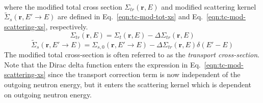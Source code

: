 \begin{appendices}
\begin{equation}
\begin{split}
\end{split}
\label{eqn:tc-transport-cont-energy}
\end{equation}
where the modified total cross section $\Sigma_{\textit{tr}}(\mathbf{r},E)$ and modified scattering kernel $\tilde{\Sigma}_{s}(\mathbf{r},{E'\rightarrow E})$ are defined in Eq.~\ref{eqn:tc-mod-tot-xs} and Eq.~\ref{eqn:tc-mod-scattering-xs}, respectively.
\begin{equation}
\Sigma_{\textit{tr}}(\mathbf{r},E) = \Sigma_{t}(\mathbf{r},E) - \Delta\Sigma_{tr}(\mathbf{r},E)
\label{eqn:tc-mod-tot-xs}
\end{equation}
\begin{equation}
\tilde{\Sigma}_{s}(\mathbf{r},{E'\rightarrow E}) = \Sigma_{s,0}(\mathbf{r},{E'\rightarrow E}) - \Delta\Sigma_{tr}(\mathbf{r},E)\delta(E'-E)
\label{eqn:tc-mod-scattering-xs}
\end{equation}
The modified total cross-section is often referred to as the \textit{transport cross-section}. Note that the Dirac delta function enters the expression in Eq.~\ref{eqn:tc-mod-scattering-xs} since the transport correction term is now independent of the outgoing neutron energy, but it enters the scattering kernel which is dependent on outgoing neutron energy.


\end{appendices}
